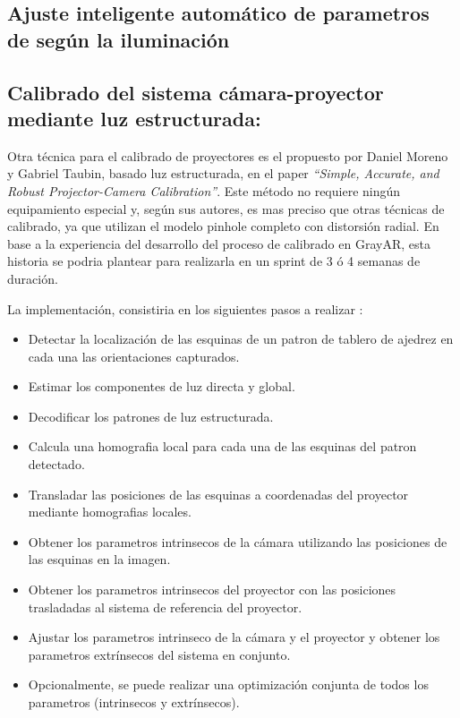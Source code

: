 \subsection{Ajuste inteligente automático de parametros de según la iluminación}

\subsection{Calibrado del sistema cámara-proyector mediante luz estructurada:} 

Otra técnica para el calibrado de proyectores es el propuesto por Daniel Moreno y Gabriel Taubin, basado luz estructurada, en el paper \textit{``Simple, Accurate, and Robust Projector-Camera Calibration''}. Este método no requiere ningún equipamiento especial y, según sus autores, es mas preciso que otras técnicas de calibrado, ya que utilizan el modelo pinhole completo con distorsión radial. En base a la experiencia del desarrollo del proceso de calibrado en GrayAR, esta historia se podria plantear para realizarla en un sprint de 3 ó 4 semanas de duración.  

La implementación, consistiria en los siguientes pasos a realizar \cite{Moreno}:
\begin{itemize}
\item Detectar la localización de las esquinas de un patron de tablero de ajedrez en cada una las orientaciones capturados.
\item Estimar los componentes de luz directa y global.
\item Decodificar los patrones de luz estructurada.
\item Calcula una homografia local para cada una de las esquinas del patron detectado.
\item Transladar las posiciones de las esquinas a coordenadas del proyector mediante homografias locales.
\item Obtener los parametros intrinsecos de la cámara utilizando las posiciones de las esquinas en la imagen.
\item Obtener los parametros intrinsecos del proyector con las posiciones trasladadas al sistema de referencia del proyector.
\item Ajustar los parametros intrinseco de la cámara y el proyector y obtener los parametros extrínsecos del sistema en conjunto.
\item Opcionalmente, se puede realizar una optimización conjunta de todos los parametros (intrinsecos y extrínsecos).
\end{itemize}

